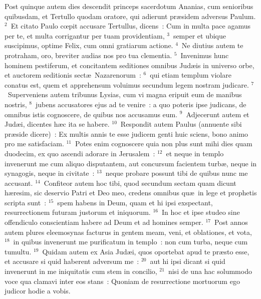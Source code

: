 \lettrine[lines=3,image=true,loversize=0.05,lraise=-0.03]{P}{}ost quinque autem dies descendit princeps sacerdotum Ananias, cum senioribus quibusdam, et Tertullo quodam oratore, qui adierunt pr\ae sidem adversus Paulum.
${}^{2}$~Et citato Paulo cœpit accusare Tertullus, dicens~: Cum in multa pace agamus per te, et multa corrigantur per tuam providentiam,
${}^{3}$~semper et ubique suscipimus, optime Felix, cum omni gratiarum actione.
${}^{4}$~Ne diutius autem te protraham, oro, breviter audias nos pro tua clementia.
${}^{5}$~Invenimus hunc hominem pestiferum, et concitantem seditiones omnibus Jud\ae is in universo orbe, et auctorem seditionis sect\ae\ Nazarenorum~:
${}^{6}$~qui etiam templum violare conatus est, quem et apprehensum voluimus secundum legem nostram judicare.
${}^{7}$~Superveniens autem tribunus Lysias, cum vi magna eripuit eum de manibus nostris,
${}^{8}$~jubens accusatores ejus ad te venire~: a quo poteris ipse judicans, de omnibus istis cognoscere, de quibus nos accusamus eum.
${}^{9}$~Adjecerunt autem et Jud\ae i, dicentes h\ae c ita se habere.
${}^{10}$~Respondit autem Paulus (annuente sibi pr\ae side dicere)~: Ex multis annis te esse judicem genti huic sciens, bono animo pro me satisfaciam.
${}^{11}$~Potes enim cognoscere quia non plus sunt mihi dies quam duodecim, ex quo ascendi adorare in Jerusalem~:
${}^{12}$~et neque in templo invenerunt me cum aliquo disputantem, aut concursum facientem turb\ae , neque in synagogis, neque in civitate~:
${}^{13}$~neque probare possunt tibi de quibus nunc me accusant.
${}^{14}$~Confiteor autem hoc tibi, quod secundum sectam quam dicunt h\ae resim, sic deservio Patri et Deo meo, credens omnibus qu\ae\ in lege et prophetis scripta sunt~:
${}^{15}$~spem habens in Deum, quam et hi ipsi exspectant, resurrectionem futuram justorum et iniquorum.
${}^{16}$~In hoc et ipse studeo sine offendiculo conscientiam habere ad Deum et ad homines semper.
${}^{17}$~Post annos autem plures eleemosynas facturus in gentem meam, veni, et oblationes, et vota,
${}^{18}$~in quibus invenerunt me purificatum in templo~: non cum turba, neque cum tumultu.
${}^{19}$~Quidam autem ex Asia Jud\ae i, quos oportebat apud te pr\ae sto esse, et accusare si quid haberent adversum me~:
${}^{20}$~aut hi ipsi dicant si quid invenerunt in me iniquitatis cum stem in concilio,
${}^{21}$~nisi de una hac solummodo voce qua clamavi inter eos stans~: Quoniam de resurrectione mortuorum ego judicor hodie a vobis.


